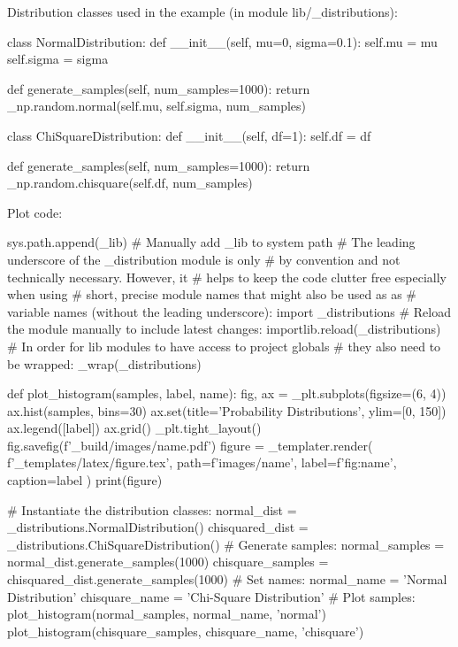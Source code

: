 Distribution classes used in the example (in module lib/\_distributions):
\begin{python}
class NormalDistribution:
    def __init__(self, mu=0, sigma=0.1):
        self.mu = mu
        self.sigma = sigma
   
    def generate_samples(self, num_samples=1000):
        return _np.random.normal(self.mu, self.sigma, num_samples)

class ChiSquareDistribution:
    def __init__(self, df=1):
        self.df = df

    def generate_samples(self, num_samples=1000):
        return _np.random.chisquare(self.df, num_samples)

\end{python}
Plot code:
\begin{python}
sys.path.append(_lib) # Manually add _lib to system path
# The leading underscore of the _distribution module is only 
# by convention and not technically necessary. However, it 
# helps to keep the code clutter free especially when using 
# short, precise module names that might also be used as as 
# variable names (without the leading underscore):
import _distributions
# Reload the module manually to include latest changes: 
importlib.reload(_distributions)
# In order for lib modules to have access to project globals 
# they also need to be wrapped:
_wrap(_distributions)

def plot_histogram(samples, label, name):
    fig, ax = _plt.subplots(figsize=(6, 4))
    ax.hist(samples, bins=30)
    ax.set(title='Probability Distributions', ylim=[0, 150])
    ax.legend([label])
    ax.grid()
    _plt.tight_layout()
    fig.savefig(f'{_build}/images/{name}.pdf')
    figure = _templater.render(
        f'{_templates}/latex/figure.tex',
        path=f'images/{name}',
        label=f'fig:{name}',
        caption=label
    )
    print(figure)

# Instantiate the distribution classes:
normal_dist         = _distributions.NormalDistribution()
chisquared_dist     = _distributions.ChiSquareDistribution()
# Generate samples:
normal_samples      = normal_dist.generate_samples(1000)
chisquare_samples   = chisquared_dist.generate_samples(1000)
# Set names:
normal_name         = 'Normal Distribution'
chisquare_name      = 'Chi-Square Distribution'
# Plot samples:
plot_histogram(normal_samples, normal_name, 'normal')
plot_histogram(chisquare_samples, chisquare_name, 'chisquare')

\end{python}
